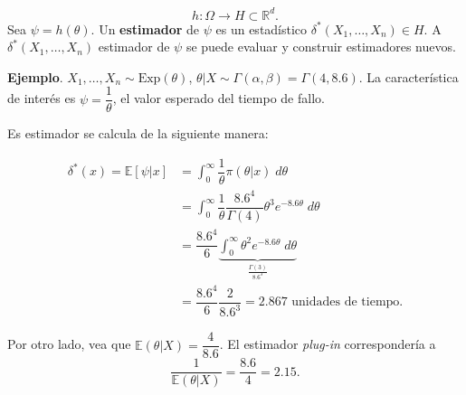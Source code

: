 \documentclass[
  12pt,
]{book}
\begin{document}
\[h:\Omega \to H \subset \mathbb{R}^d.\]
Sea \(\psi = h(\theta)\). Un \textbf{estimador} de \(\psi\) es un estadístico \(\delta^*(X_1,\dots, X_n) \in H\). A \(\delta^*(X_1,\dots, X_n)\) estimador de \(\psi\) se puede evaluar y construir estimadores nuevos.

\textbf{Ejemplo}. \(X_1,\dots, X_n \sim \text{Exp}(\theta)\), \(\theta|X \sim \Gamma(\alpha,\beta) = \Gamma (4,8.6)\). La característica de interés es \(\psi = \dfrac{1}\theta\), el valor esperado del tiempo de fallo.

Es estimador se calcula de la siguiente manera:

\begin{align*}
\delta^*(x) = \mathbb{E}[\psi|x] & = \int_{0}^\infty \dfrac{1}\theta\pi(\theta|x)\;d\theta\\
& = \int_{0}^\infty \dfrac{1}\theta \dfrac{8.6^4}{\Gamma(4)} \theta^3e^{-8.6\theta}\;d\theta\\
&=\dfrac{8.6^4}{6} \underbrace{\int_{0}^\infty \theta^2 e^{-8.6\theta}\;d\theta}_{\frac{\Gamma(3)}{8.6^3}}\\
& = \dfrac{8.6^4}{6}\dfrac{2}{8.6^3} = 2.867 \text{ unidades de tiempo.}
\end{align*}

Por otro lado, vea que \(\mathbb{E}(\theta|X) = \dfrac{4}{8.6}\). El estimador \emph{plug-in} correspondería a
\[\dfrac{1}{\mathbb{E}(\theta|X)} = \dfrac{8.6}{4} = 2.15.\]

\printbibliography
\end{document}
